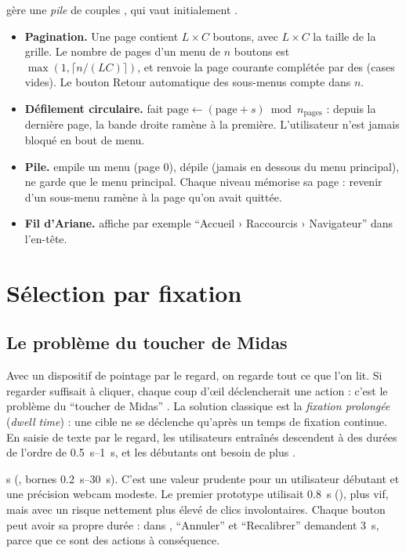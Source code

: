  gère une \emph{pile} de couples , qui vaut initialement \code{[["principal", 0]]}.

\begin{itemize}
  \item \textbf{Pagination.} Une page contient $L\times C$ boutons, avec $L\times C$ la taille de la grille. Le nombre de pages d'un menu de $n$ boutons est $\max(1, \lceil n/(LC) \rceil)$, et  renvoie la page courante complétée par des  (cases vides). Le bouton Retour automatique des sous-menus compte dans $n$.
  \item \textbf{Défilement circulaire.}  fait $\text{page} \leftarrow (\text{page} + s) \bmod n_\text{pages}$ : depuis la dernière page, la bande droite ramène à la première. L'utilisateur n'est jamais bloqué en bout de menu.
  \item \textbf{Pile.}  empile un menu (page 0),  dépile (jamais en dessous du menu principal),  ne garde que le menu principal. Chaque niveau mémorise sa page : revenir d'un sous-menu ramène à la page qu'on avait quittée.
  \item \textbf{Fil d'Ariane.}  affiche par exemple \enquote{Accueil › Raccourcis › Navigateur} dans l'en-tête.
\end{itemize}

\section{Sélection par fixation}

\subsection{Le problème du toucher de Midas}

Avec un dispositif de pointage par le regard, on regarde tout ce que l'on lit. Si regarder suffisait à cliquer, chaque coup d'œil déclencherait une action : c'est le problème du \enquote{toucher de Midas} \cite{jacob1991}. La solution classique est la \emph{fixation prolongée} (\emph{dwell time}) : une cible ne se déclenche qu'après un temps de fixation continue. En saisie de texte par le regard, les utilisateurs entraînés descendent à des durées de l'ordre de \qtyrange{0.5}{1}{\second}, et les débutants ont besoin de plus \cite{majaranta2002}.

\begin{origine}
 s (\empi, bornes \qtyrange{0.2}{30}{\second}). C'est une valeur prudente pour un utilisateur débutant et une précision webcam modeste. Le premier prototype utilisait \qty{0.8}{\second} (), plus vif, mais avec un risque nettement plus élevé de clics involontaires. Chaque bouton peut avoir sa propre durée : dans , \enquote{Annuler} et \enquote{Recalibrer} demandent \qty{3}{\second}, parce que ce sont des actions à conséquence.
\end{origine}

